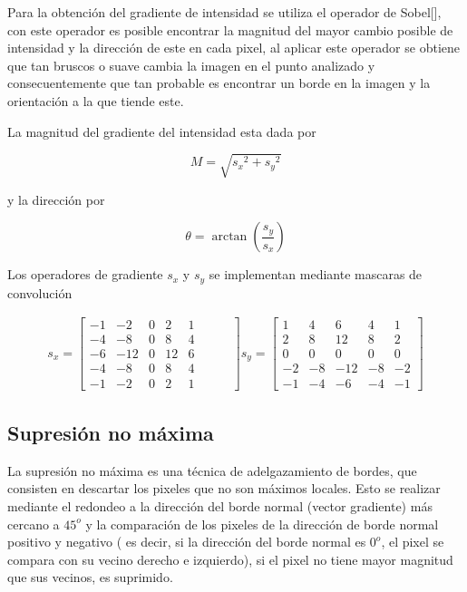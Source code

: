 Para la obtención del gradiente de intensidad se utiliza el operador de Sobel[], con este operador es posible encontrar
la magnitud del mayor cambio posible de intensidad y la dirección de este en cada pixel, al aplicar este operador se
obtiene que tan bruscos o suave cambia la imagen en el punto analizado y consecuentemente que tan probable es encontrar
un borde en la imagen y la orientación a la que tiende este.

La magnitud del gradiente del intensidad esta dada por 

\begin{equation}
M=\sqrt{{s_{x}}^{2}+{s_{y}}^{2}}
\end{equation}

y la dirección por

\begin{equation}
\theta = \arctan\left({\frac{s_{y}}{s_{x}}}\right)
\end{equation} 

Los operadores de gradiente $s_{x}$ y $s_{y}$ se implementan mediante mascaras de convolución 

\begin{equation}
\begin{array}{cclcccl}
s_{x} =\begin{bmatrix}
-1 & -2 & 0 & 2 & 1 \\ 
-4 & -8 & 0 & 8 & 4 \\ 
-6 & -12 & 0 & 12 & 6 \\ 
-4 & -8 & 0 & 8 & 4 \\ 
-1 & -2 & 0 & 2 & 1 &\hspace{1em}&
\end{bmatrix}
s_{y} =\begin{bmatrix}
1 & 4 & 6 & 4 & 1 \\ 
2 & 8 & 12 & 8 & 2 \\ 
0 & 0 & 0 & 0 & 0 \\ 
-2 & -8 & -12 & -8 & -2\\ 
-1 & -4 & -6 & -4 & -1
\end{bmatrix} 
\end{array}
\end{equation}

\subsection{Supresión no máxima}

La supresión no máxima es una técnica de adelgazamiento de bordes, que consisten en descartar los pixeles que no son
máximos locales. Esto se realizar mediante el redondeo a la dirección del borde normal (vector gradiente) más cercano a
$45^{o}$ y la comparación de los pixeles de la dirección de borde normal positivo y negativo ( es decir, si la dirección
del borde normal es $0^{o}$, el pixel se compara con su vecino derecho e izquierdo), si el pixel no tiene mayor magnitud
que sus vecinos, es suprimido.


